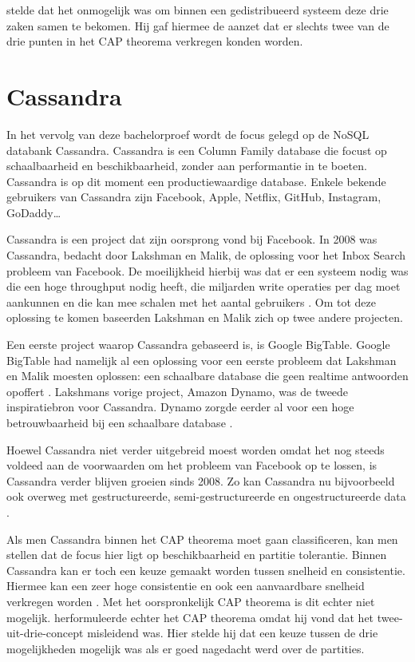 \cite{brewer2000towards} stelde dat het onmogelijk was om binnen een gedistribueerd systeem deze drie zaken samen te bekomen.
Hij gaf hiermee de aanzet dat er slechts twee van de drie punten in het CAP theorema verkregen konden worden.

\section{Cassandra}

In het vervolg van deze bachelorproef wordt de focus gelegd op de NoSQL databank Cassandra.
Cassandra is een Column Family database die focust op schaalbaarheid en beschikbaarheid, zonder aan performantie in te boeten.
Cassandra is op dit moment een productiewaardige database.
Enkele bekende gebruikers van Cassandra zijn Facebook, Apple, Netflix, GitHub, Instagram, GoDaddy\dots

Cassandra is een project dat zijn oorsprong vond bij Facebook.
In 2008 was Cassandra, bedacht door Lakshman en Malik, de oplossing voor het Inbox Search probleem van Facebook.
De moeilijkheid hierbij was dat er een systeem nodig was die een hoge throughput nodig heeft, die miljarden write operaties per dag moet aankunnen en die kan mee schalen met het aantal gebruikers \citep{lakshman2010cassandra}.
Om tot deze oplossing te komen baseerden Lakshman en Malik zich op twee andere projecten.

Een eerste project waarop Cassandra gebaseerd is, is Google BigTable.
Google BigTable had namelijk al een oplossing voor een eerste probleem dat Lakshman en Malik moesten oplossen: een schaalbare database die geen realtime antwoorden opoffert \citep{chang2008bigtable}.
Lakshmans vorige project, Amazon Dynamo, was de tweede inspiratiebron voor Cassandra.
Dynamo zorgde eerder al voor een hoge betrouwbaarheid bij een schaalbare database \citep{decandia2007dynamo}.

Hoewel Cassandra niet verder uitgebreid moest worden omdat het nog steeds voldeed aan de voorwaarden om het probleem van Facebook op te lossen, is Cassandra verder blijven groeien sinds 2008.
Zo kan Cassandra nu bijvoorbeeld ook overweg met gestructureerde, semi-gestructureerde en ongestructureerde data \citep{kan2014cassandra}.

Als men Cassandra binnen het CAP theorema moet gaan classificeren, kan men stellen dat de focus hier ligt op beschikbaarheid en partitie tolerantie.
Binnen Cassandra kan er toch een keuze gemaakt worden tussen snelheid en consistentie.
Hiermee kan een zeer hoge consistentie en ook een aanvaardbare snelheid verkregen worden \citep{ellis2009cassandra}.
Met het oorspronkelijk CAP theorema is dit echter niet mogelijk.
\cite{brewer2012cap} herformuleerde echter het CAP theorema omdat hij vond dat het twee-uit-drie-concept misleidend was.
Hier stelde hij dat een keuze tussen de drie mogelijkheden mogelijk was als er goed nagedacht werd over de partities.

